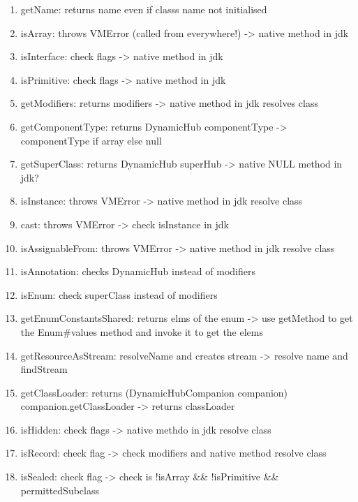 \begin{enumerate}
    \item getName: returns name even if classs name not initialised
    \item isArray: throws VMError (called from everywhere!) -> native method in jdk
    \item isInterface: check flags -> native method in jdk
    \item isPrimitive: check flags -> native method in jdk
    \item getModifiers: returns modifiers -> native method in jdk resolves class
    \item getComponentType: returns DynamicHub componentType -> componentType if array else null
    \item getSuperClass: returns DynamicHub superHub -> native NULL method in jdk?
    \item isInstance: throws VMError -> native method in jdk resolve class
    \item cast: throws VMError -> check isInstance in jdk
    \item isAssignableFrom: throws VMError -> native method in jdk resolve class
    \item isAnnotation: checks DynamicHub instead of modifiers
    \item isEnum: check superClass instead of modifiers
    \item getEnumConstantsShared: returns elms of the enum -> use getMethod to get the Enum#values method and invoke it to get the elems
    \item getResourceAsStream: resolveName and creates stream -> resolve name and findStream
    \item getClassLoader: returns (DynamicHubCompanion companion) companion.getClassLoader -> returns classLoader
    
    \item isHidden: check flags -> native methdo in jdk resolve class
    \item isRecord: check flag -> check modifiers and native method resolve class
    \item isSealed: check flag -> check is !isArray \&\& !isPrimitive \&\& permittedSubclass
    

\end{enumerate}
